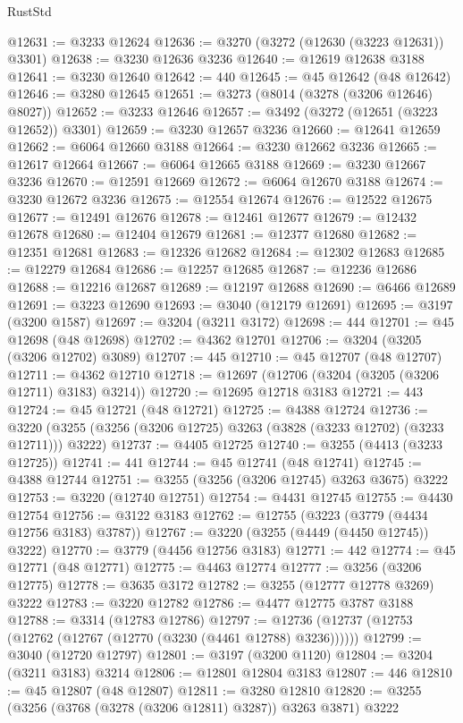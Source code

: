 \begin{lexlean}{RustStd}
\begin{coremodule}
{\begin{coremodule}
{{{{{{{{{{{{{{{{{{{{{{{{{{{{{{{{{{{{{@12631 := @3233 @12624
@12636 := @3270 (@3272 (@12630 (@3223 @12631)) @3301)
@12638 := @3230 @12636 @3236
@12640 := @12619 @12638 @3188
@12641 := @3230 @12640
@12642 := 440
@12645 := @45 @12642 (@48 @12642)
@12646 := @3280 @12645
@12651 := @3273 (@8014 (@3278 (@3206 @12646) @8027))
@12652 := @3233 @12646
@12657 := @3492 (@3272 (@12651 (@3223 @12652)) @3301)
@12659 := @3230 @12657 @3236
@12660 := @12641 @12659
@12662 := @6064 @12660 @3188
@12664 := @3230 @12662 @3236
@12665 := @12617 @12664
@12667 := @6064 @12665 @3188
@12669 := @3230 @12667 @3236
@12670 := @12591 @12669
@12672 := @6064 @12670 @3188
@12674 := @3230 @12672 @3236
@12675 := @12554 @12674
@12676 := @12522 @12675
@12677 := @12491 @12676
@12678 := @12461 @12677
@12679 := @12432 @12678
@12680 := @12404 @12679
@12681 := @12377 @12680
@12682 := @12351 @12681
@12683 := @12326 @12682
@12684 := @12302 @12683
@12685 := @12279 @12684
@12686 := @12257 @12685
@12687 := @12236 @12686
@12688 := @12216 @12687
@12689 := @12197 @12688
@12690 := @6466 @12689
@12691 := @3223 @12690
@12693 := @3040 (@12179 @12691)
@12695 := @3197 (@3200 @1587)
@12697 := @3204 (@3211 @3172)
@12698 := 444
@12701 := @45 @12698 (@48 @12698)
@12702 := @4362 @12701
@12706 := @3204 (@3205 (@3206 @12702) @3089)
@12707 := 445
@12710 := @45 @12707 (@48 @12707)
@12711 := @4362 @12710
@12718 := @12697 (@12706 (@3204 (@3205 (@3206 @12711) @3183) @3214))
@12720 := @12695 @12718 @3183
@12721 := 443
@12724 := @45 @12721 (@48 @12721)
@12725 := @4388 @12724
@12736 := @3220 (@3255 (@3256 (@3206 @12725) @3263 (@3828 (@3233 @12702) (@3233 @12711))) @3222)
@12737 := @4405 @12725
@12740 := @3255 (@4413 (@3233 @12725))
@12741 := 441
@12744 := @45 @12741 (@48 @12741)
@12745 := @4388 @12744
@12751 := @3255 (@3256 (@3206 @12745) @3263 @3675) @3222
@12753 := @3220 (@12740 @12751)
@12754 := @4431 @12745
@12755 := @4430 @12754
@12756 := @3122 @3183
@12762 := @12755 (@3223 (@3779 (@4434 @12756 @3183) @3787))
@12767 := @3220 (@3255 (@4449 (@4450 @12745)) @3222)
@12770 := @3779 (@4456 @12756 @3183)
@12771 := 442
@12774 := @45 @12771 (@48 @12771)
@12775 := @4463 @12774
@12777 := @3256 (@3206 @12775)
@12778 := @3635 @3172
@12782 := @3255 (@12777 @12778 @3269) @3222
@12783 := @3220 @12782
@12786 := @4477 @12775 @3787 @3188
@12788 := @3314 (@12783 @12786)
@12797 := @12736 (@12737 (@12753 (@12762 (@12767 (@12770 (@3230 (@4461 @12788) @3236))))))
@12799 := @3040 (@12720 @12797)
@12801 := @3197 (@3200 @1120)
@12804 := @3204 (@3211 @3183) @3214
@12806 := @12801 @12804 @3183
@12807 := 446
@12810 := @45 @12807 (@48 @12807)
@12811 := @3280 @12810
@12820 := @3255 (@3256 (@3768 (@3278 (@3206 @12811) @3287)) @3263 @3871) @3222
}}}}}}}}}}}}}}}}}}}}}}}}}}}}}}}}}}}}}
\end{coremodule}}
\end{coremodule}
\end{lexlean}
